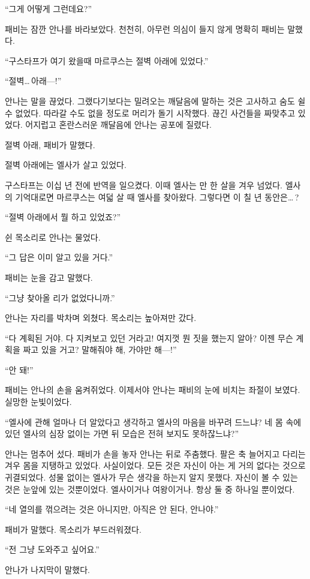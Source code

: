 ``그게 어떻게 그런데요?''

패비는 잠깐 안나를 바라보았다. 천천히, 아무런 의심이 들지 않게 명확히 패비는 말했다.

``구스타프가 여기 왔을때 마르쿠스는 절벽 아래에 있었다.''

``절벽\ldots\,아래—!''

안나는 말을 끊었다. 그랬다기보다는 밀려오는 깨달음에 말하는 것은 고사하고 숨도 쉴 수 없었다. 따라갈 수도 없을 정도로 머리가 돌기 시작했다. 끊긴 사건들을 짜맞추고 있었다. 어지럽고 혼란스러운 깨달음에 안나는 공포에 질렸다.

절벽 아래, 패비가 말했다.

절벽 아래에는 엘사가 살고 있었다.

구스타프는 이십 년 전에 반역을 일으켰다. 이때 엘사는 만 한 살을 겨우 넘었다. 엘사의 기억대로면 마르쿠스는 여덟 살 때 엘사를 찾아왔다. 그렇다면 이 칠 년 동안은\ldots\,?

``절벽 아래에서 뭘 하고 있었죠?''

쉰 목소리로 안나는 물었다.

``그 답은 이미 알고 있을 거다.''

패비는 눈을 감고 말했다.

``그냥 찾아올 리가 없었다니까.''

안나는 자리를 박차며 외쳤다. 목소리는 높아져만 갔다.

``다 계획된 거야. 다 지켜보고 있던 거라고! 여지껏 뭔 짓을 했는지 알아? 이젠 무슨 계획을 짜고 있을 거고? 말해줘야 해, 가야만 해—!''

``안 돼!''

패비는 안나의 손을 움켜쥐었다. 이제서야 안나는 패비의 눈에 비치는 좌절이 보였다. 실망한 눈빛이었다.

``엘사에 관해 얼마나 더 알았다고 생각하고 엘사의 마음을 바꾸려 드느냐? 네 몸 속에 있던 엘사의 심장 없이는 가면 뒤 모습은 전혀 보지도 못하잖느냐?''

안나는 멈추어 섰다. 패비가 손을 놓자 안나는 뒤로 주춤했다. 팔은 축 늘어지고 다리는 겨우 몸을 지탱하고 있었다. 사실이었다. 모든 것은 자신이 아는 게 거의 없다는 것으로 귀결되었다. 성물 없이는 엘사가 무슨 생각을 하는지 알지 못했다. 자신이 볼 수 있는 것은 눈앞에 있는 것뿐이었다. 엘사이거나 여왕이거나. 항상 둘 중 하나일 뿐이었다.

``네 열의를 꺾으려는 것은 아니지만, 아직은 안 된다, 안나야.''

패비가 말했다. 목소리가 부드러워졌다.

``전 그냥 도와주고 싶어요.''

안나가 나지막이 말했다.

